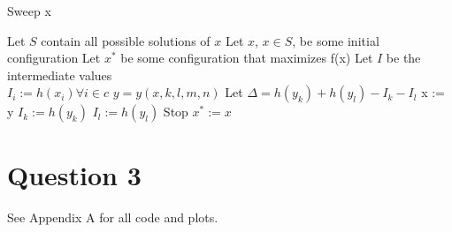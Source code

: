 \documentclass{article}
\begin{document}
\begin{algorithm}
\caption{Sweep x}
\begin{algorithmic}
  \STATE Let $S$ contain all possible solutions of $x$
  \STATE Let $x$, $x \in S$, be some initial configuration
  \STATE Let $x^*$ be some configuration that maximizes f(x)
  \STATE Let $I$ be the intermediate values\\
  \STATE $I_i := h(x_i) \forall i \in c$ 
    \STATE $y = y(x, k, l, m, n)$
    \STATE Let $\Delta = h(y_k) + h(y_l) - I_k - I_l$
      \STATE x := y
      \STATE $I_k := h(y_k)$ 
      \STATE $I_l := h(y_l)$ 
      \STATE Stop
    \ENDIF
  \ENDFOR
  \ENDFOR
  \ENDFOR
  \ENDFOR
  \ENDWHILE
  \STATE $x^* := x$
\end{algorithmic}
\end{algorithm}

\section{Question 3}
See Appendix A for all code and plots. 
\end{document}
